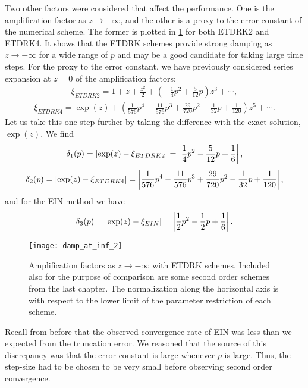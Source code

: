 Two other factors were considered that affect the performance. One is the amplification factor as $z\to-\infty$, and the other is a proxy to the error constant of the numerical scheme. The former is plotted in \cref{fig:damp fac at inf etd} for both ETDRK2 and ETDRK4. It shows that the ETDRK schemes provide strong damping as $z\to-\infty$ for a wide range of $p$ and may be a good candidate for taking large time steps. For the proxy to the error constant, we have previously considered series expansion at $z=0$ of the amplification factors:
\begin{align}
        \xi_{ETDRK2} = 1+ z + \frac{z^2}{2} + \left(-\frac{1}{4}p^2 + \frac{5}{12}p \right) z^3 + \cdots ,
\end{align}
\begin{align}
        \xi_{ETDRK4} = \exp(z) + \left( 
\frac{1}{576}p^4 
- \frac{11}{576}p^3
+ \frac{29}{720}p^2
- \frac{1}{32}p
+ \frac{1}{120} 
\right) z^5 + \cdots .
\end{align}
Let us take this one step further by taking the difference with the exact solution, $\exp(z)$. We find 
\begin{align}
        \delta_1(p) = \left|\exp(z) - \xi_{ETDRK2}\right| 
= \left|\frac{1}{4}p^2 - \frac{5}{12}p + \frac{1}{6}\right|,
\end{align}
\begin{align}
        \delta_2(p) = \left|\exp(z) - \xi_{ETDRK4}\right| 
= \left|\frac{1}{576}p^4 
- \frac{11}{576}p^3
+ \frac{29}{720}p^2
- \frac{1}{32}p
+ \frac{1}{120} \right|,
\end{align}
and for the EIN method we have 
\begin{align}
\delta_3(p) = \left|\exp(z) - \xi_{EIN}\right| 
= \left|\frac{1}{2} p^2 - \frac{1}{2}p + \frac{1}{6}\right|.
\end{align}

\begin{figure}[htb!]
        \centering
\texttt{[image: damp\_at\_inf\_2]}
\caption[Amplification factors as $z\to-\infty$]{Amplification factors as $z\to-\infty$ with ETDRK schemes. Included also for the purpose of comparison are some second order schemes from the last chapter. The normalization along the horizontal axis is with respect to the lower limit of the parameter restriction of each scheme.}
\label{fig:damp fac at inf etd}
\end{figure}

Recall from before that the observed convergence rate of EIN was less than we expected from the truncation error. We reasoned that the source of this discrepancy was that the error constant is large whenever $p$ is large. Thus, the step-size had to be chosen to be very small before observing second order convergence.

